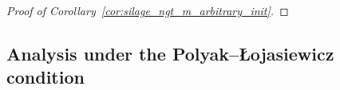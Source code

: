 \documentclass{article}
\newcommand{\cO}{{\cal O}}
\newcommand{\eqdef}{:=}
\newcommand{\rb}[1]{\left(#1\right)}
\theoremstyle{plain}
\begin{document}
\begin{proof}[Proof of Corollary~\ref{cor:silage_ngt_m_arbitrary_init}]
\end{proof}

\subsection{Analysis under the Polyak--\L{}ojasiewicz condition}\label{sec:app-pl-ngt-m}
\end{document}

